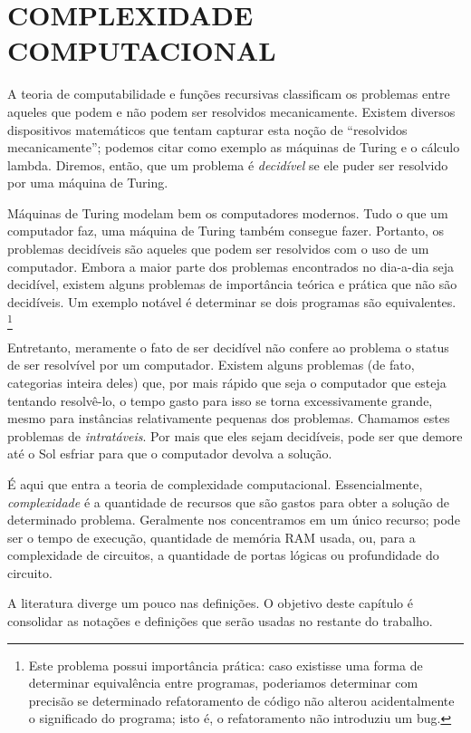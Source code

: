 \chapter{COMPLEXIDADE COMPUTACIONAL}

A teoria de computabilidade e funções recursivas
classificam os problemas entre
aqueles que podem e não podem ser resolvidos mecanicamente.
Existem diversos dispositivos matemáticos
que tentam capturar esta noção de
``resolvidos mecanicamente'';
podemos citar como exemplo
as máquinas de Turing
e o cálculo lambda.
Diremos, então,
que um problema é \emph{decidível}
se ele puder ser resolvido por uma máquina de Turing.

Máquinas de Turing modelam bem os computadores modernos.
Tudo o que um computador faz,
uma máquina de Turing também consegue fazer.
Portanto, os problemas decidíveis são aqueles que
podem ser resolvidos com o uso de um computador.
Embora a maior parte dos problemas
encontrados no dia-a-dia seja decidível,
existem alguns problemas de importância teórica e prática
que não são decidíveis.
Um exemplo notável é determinar se dois programas são equivalentes.
\footnote{
    Este problema possui importância prática:
    caso existisse uma forma de determinar equivalência entre programas,
    poderiamos determinar com precisão
    se determinado refatoramento de código
    não alterou acidentalmente o significado do programa;
    isto é, o refatoramento não introduziu um bug.
}

Entretanto,
meramente o fato de ser decidível
não confere ao problema o status de
ser resolvível por um computador.
Existem alguns problemas
(de fato, categorias inteira deles)
que, por mais rápido que seja o computador
que esteja tentando resolvê-lo,
o tempo gasto para isso
se torna excessivamente grande,
mesmo para instâncias relativamente pequenas dos problemas.
Chamamos estes problemas de \emph{intratáveis}.
Por mais que eles sejam decidíveis,
pode ser que demore até o Sol esfriar
para que o computador devolva a solução.

É aqui que entra a teoria de complexidade computacional.
Essencialmente,
\emph{complexidade}
é a quantidade de recursos que são gastos
para obter a solução de determinado problema.
Geralmente nos concentramos em um único recurso;
pode ser o tempo de execução,
quantidade de memória RAM usada,
ou,
para a complexidade de circuitos,
a quantidade de portas lógicas
ou profundidade do circuito.

A literatura diverge um pouco nas definições.
O objetivo deste capítulo é consolidar
as notações e definições
que serão usadas no restante do trabalho.


